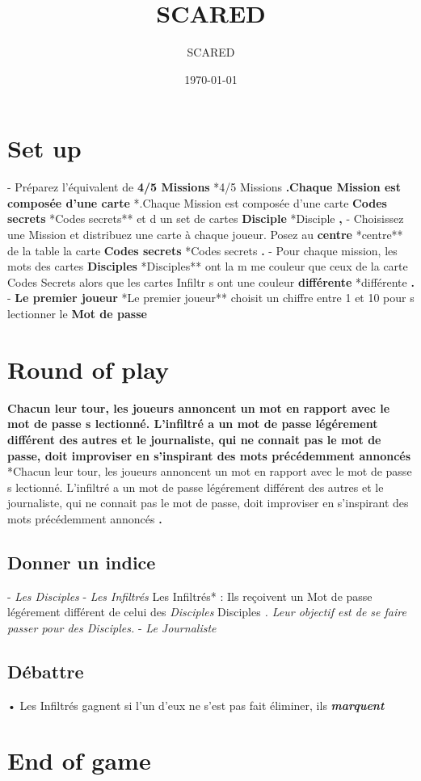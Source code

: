 \documentclass{article}%
\title{SCARED}%
\author{SCARED}%
\date{\today}%
\begin{document}
%
\pagestyle{empty}%
\normalsize%
\maketitle%
\section{ Set up
}%
\label{sec:Setup}%
{-} Préparez l'équivalent de %
\textbf{4/5 Missions}%
*4/5 Missions%
\textbf{.Chaque Mission est composée d'une carte }%
*.Chaque Mission est composée d'une carte %
\textbf{Codes secrets}%
*Codes secrets** et d un set de cartes %
\textbf{Disciple}%
*Disciple%
\textbf{,}%
{-} Choisissez une Mission et distribuez une carte à chaque joueur. Posez au %
\textbf{centre}%
*centre** de la table la carte %
\textbf{Codes secrets}%
*Codes secrets%
\textbf{.
}%
{-} Pour chaque mission, les mots des cartes %
\textbf{Disciples}%
*Disciples** ont la m me couleur que ceux de la carte Codes Secrets alors que les cartes Infiltr s ont une couleur%
\textbf{différente}%
*différente%
\textbf{.
}%
{-} %
\textbf{Le premier joueur}%
*Le premier joueur** choisit un chiffre entre 1 et 10 pour s lectionner le %
\textbf{Mot de passe}

%
\section{ Round of play
}%
\label{sec:Roundofplay}%
%
\textbf{Chacun leur tour, les joueurs annoncent un mot en rapport avec le mot de passe s lectionné. L'infiltré a un mot de passe légérement différent des autres et le journaliste, qui ne connait pas le mot de passe, doit improviser en s'inspirant des mots précédemment annoncés}%
*Chacun leur tour, les joueurs annoncent un mot en rapport avec le mot de passe s lectionné. L'infiltré a un mot de passe légérement différent des autres et le journaliste, qui ne connait pas le mot de passe, doit improviser en s'inspirant des mots précédemment annoncés%
\textbf{.
}

%
\subsection{ Donner un indice
}%
\label{subsec:Donnerunindice}%
{-} %
\textit{Les Disciples}%
{-} %
\textit{Les Infiltrés}%
Les Infiltrés* : Ils reçoivent un Mot de passe légérement différent de celui des %
\textit{Disciples}%
Disciples%
\textit{. Leur objectif est de se faire passer pour des Disciples.
}%
{-} %
\textit{Le Journaliste}

%
\subsection{ Débattre
}%
\label{subsec:Dbattre}%
• Les Infiltrés gagnent si l'un d'eux ne s'est pas fait éliminer, ils %
\textbf{\textit{marquent}}

%
\section{ End of game
}%
\label{sec:Endofgame}%

%
\end{document}
